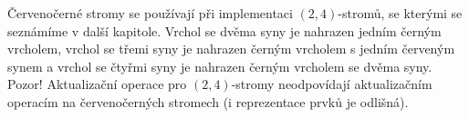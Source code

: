 \begin{pozn}
Červenočerné stromy se používají při implementaci $(2,4)$-stromů, se
kterými se seznámíme v další kapitole. Vrchol 
se dvěma syny je nahrazen jedním černým vrcholem, vrchol se třemi syny 
je nahrazen černým vrcholem s jedním červeným synem a vrchol se čtyřmi 
syny je nahrazen černým vrcholem se dvěma syny. Pozor! Aktualizační 
operace pro $(2,4)$-stromy neodpovídají aktualizačním operacím na 
červenočerných stromech (i reprezentace prvků je odlišná).
\end{pozn}

